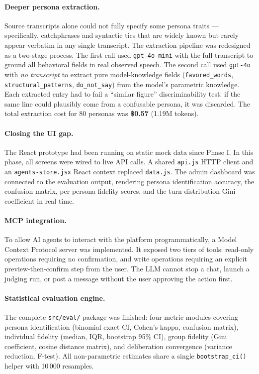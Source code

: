\documentclass[12pt,a4paper]{article}
\begin{document}
\paragraph{Deeper persona extraction.}
Source transcripts alone could not fully specify some persona traits --- specifically,
catchphrases and syntactic tics that are widely known but rarely appear verbatim in any
single transcript. The extraction pipeline was redesigned as a two-stage process. The first
call used \texttt{gpt-4o-mini} with the full transcript to ground all behavioral fields in real
observed speech. The second call used \texttt{gpt-4o} with \emph{no transcript} to extract
pure model-knowledge fields (\texttt{favored\_words}, \texttt{structural\_patterns},
\texttt{do\_not\_say}) from the model's parametric knowledge. Each extracted entry had to fail
a ``similar figure'' discriminability test: if the same line could plausibly come from a
confusable persona, it was discarded. The total extraction cost for 80 personas was
\textbf{\$0.57} (1.19M tokens).

\paragraph{Closing the UI gap.}
The React prototype had been running on static mock data since Phase I. In this phase, all
screens were wired to live API calls. A shared \texttt{api.js} HTTP client and an
\texttt{agents-store.jsx} React context replaced \texttt{data.js}. The admin dashboard was
connected to the evaluation output, rendering persona identification accuracy, the confusion
matrix, per-persona fidelity scores, and the turn-distribution Gini coefficient in real time.

\paragraph{MCP integration.}
To allow AI agents to interact with the platform programmatically, a Model Context Protocol
server was implemented. It exposed two tiers of tools: read-only operations requiring no
confirmation, and write operations requiring an explicit preview-then-confirm step from the
user. The LLM cannot stop a chat, launch a judging run, or post a message without the user
approving the action first.

\paragraph{Statistical evaluation engine.}
The complete \texttt{src/eval/} package was finished: four metric modules covering persona
identification (binomial exact CI, Cohen's kappa, confusion matrix), individual fidelity
(median, IQR, bootstrap 95\% CI), group fidelity (Gini coefficient, cosine distance matrix),
and deliberation convergence (variance reduction, F-test). All non-parametric estimates share
a single \texttt{bootstrap\_ci()} helper with 10\,000 resamples.
\end{document}

